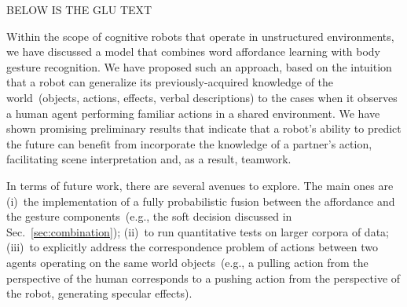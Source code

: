 BELOW IS THE GLU TEXT

Within the scope of cognitive robots that operate in unstructured environments, we have discussed a model that combines word affordance learning with body gesture recognition. We have proposed such an approach, based on the intuition that a robot can generalize its previously-acquired knowledge of the world~(objects, actions, effects, verbal descriptions) to the cases when it observes a human agent performing familiar actions in a shared \hr{} environment. We have shown promising preliminary results that indicate that a robot's ability to predict the future can benefit from incorporate the knowledge of a partner's action, facilitating scene interpretation and, as a result, teamwork.

In terms of future work, there are several avenues to explore. The main ones are (i)~the implementation of a fully probabilistic fusion between the affordance and the gesture components~(e.g., the soft decision discussed in Sec.~\ref{sec:combination}); (ii)~to run quantitative tests on larger corpora of \hr{} data; (iii)~to explicitly address the correspondence problem of actions between two agents operating on the same world objects~(e.g., a pulling action from the perspective of the human corresponds to a pushing action from the perspective of the robot, generating specular effects).
